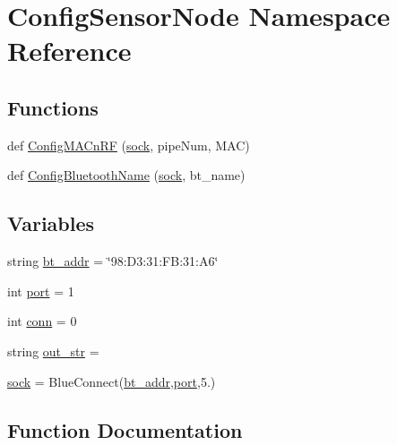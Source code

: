 \hypertarget{namespaceConfigSensorNode}{}\section{Config\+Sensor\+Node Namespace Reference}
\label{namespaceConfigSensorNode}
\subsection*{Functions}
\begin{DoxyCompactItemize}
\item 
def \hyperlink{namespaceConfigSensorNode_adbbe226b0c37c4c20e38d3cb000ae338}{Config\+M\+A\+Cn\+RF} (\hyperlink{namespaceConfigSensorNode_a355f029c49f6fbfc56463a4276debbb9}{sock}, pipe\+Num, M\+AC)
\item 
def \hyperlink{namespaceConfigSensorNode_a9743a906cd63f92eb92bc1bcf33cd291}{Config\+Bluetooth\+Name} (\hyperlink{namespaceConfigSensorNode_a355f029c49f6fbfc56463a4276debbb9}{sock}, bt\+\_\+name)
\end{DoxyCompactItemize}
\subsection*{Variables}
\begin{DoxyCompactItemize}
\item 
string \hyperlink{namespaceConfigSensorNode_a2a256a51aae354ee6485d21cb86cb2fd}{bt\+\_\+addr} = \char`\"{}98\+:D3\+:31\+:\+F\+B\+:31\+:\+A6\char`\"{}
\item 
int \hyperlink{namespaceConfigSensorNode_a5982a85097d3c75e147cab5f9c788eda}{port} = 1
\item 
int \hyperlink{namespaceConfigSensorNode_af6cc4bdac63d1aa1101a09a1b0397dff}{conn} = 0
\item 
string \hyperlink{namespaceConfigSensorNode_a342daf0f5ba11071cd0705f1c2b0b039}{out\+\_\+str} = \textquotesingle{}\textquotesingle{}
\item 
\hyperlink{namespaceConfigSensorNode_a355f029c49f6fbfc56463a4276debbb9}{sock} = Blue\+Connect(\hyperlink{namespaceConfigSensorNode_a2a256a51aae354ee6485d21cb86cb2fd}{bt\+\_\+addr},\hyperlink{namespaceConfigSensorNode_a5982a85097d3c75e147cab5f9c788eda}{port},5.)
\end{DoxyCompactItemize}


\subsection{Function Documentation}

